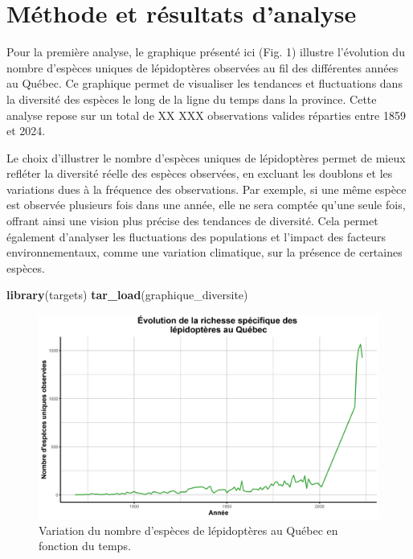 \documentclass[9pt,twocolumn,twoside,]{pnas-new}
\newenvironment{Shaded}{\begin{snugshade}}{\end{snugshade}}
\newcommand{\FunctionTok}[1]{\textcolor[rgb]{0.13,0.29,0.53}{\textbf{#1}}}
\newcommand{\NormalTok}[1]{#1}
\begin{document}
\section{Méthode et résultats
d'analyse}\label{muxe9thode-et-ruxe9sultats-danalyse}

Pour la première analyse, le graphique présenté ici (Fig. 1) illustre
l'évolution du nombre d'espèces uniques de lépidoptères observées au fil
des différentes années au Québec. Ce graphique permet de visualiser les
tendances et fluctuations dans la diversité des espèces le long de la
ligne du temps dans la province. Cette analyse repose sur un total de XX
XXX observations valides réparties entre 1859 et 2024.

Le choix d'illustrer le nombre d'espèces uniques de lépidoptères permet
de mieux refléter la diversité réelle des espèces observées, en excluant
les doublons et les variations dues à la fréquence des observations. Par
exemple, si une même espèce est observée plusieurs fois dans une année,
elle ne sera comptée qu'une seule fois, offrant ainsi une vision plus
précise des tendances de diversité. Cela permet également d'analyser les
fluctuations des populations et l'impact des facteurs environnementaux,
comme une variation climatique, sur la présence de certaines espèces.

\begin{Shaded}
\begin{Highlighting}[]
\FunctionTok{library}\NormalTok{(targets)}
\FunctionTok{tar\_load}\NormalTok{(graphique\_diversite)}
\end{Highlighting}
\end{Shaded}

\begin{figure}
\includegraphics[width=0.9\linewidth]{Rapport/graphique_biodiversite} \caption{Variation du nombre d'espèces de lépidoptères au Québec en fonction du temps.}\label{fig:fig_graphique_biodiversite}
\end{figure}
\end{document}
